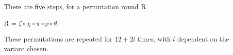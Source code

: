\documentclass[12pt]{artikel3}                  %
\begin{document}
There are five steps, for a permutation round R.
\begin{center}R = $\zeta \circ \chi \circ \pi \circ \rho \circ \theta$. \end{center} 
These permutations are repeated for $12 + 2l$ times, with $l$ dependent on the variant chosen.
\end{document}
